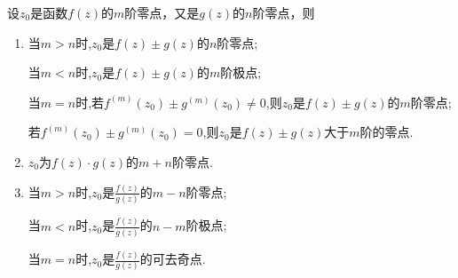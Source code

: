 \documentclass[../../main.tex]{subfiles}%
\begin{document}
\begin{proposition}\label{proposition:函数和积商的零点}
设$z_0$是函数$f(z)$的$m$阶零点，又是$g(z)$的$n$阶零点，则
\begin{enumerate}[(1)]
\item 当$m>n$时,$z_0$是$f(z)\pm  g(z)$的$n$阶零点;

当$m<n$时,$z_0$是$f(z)\pm  g(z)$的$m$阶极点;

当$m=n$时,若$f^{\left( m \right)}\left( z_0 \right) \pm g^{\left( m \right)}\left( z_0 \right) \neq0$,则$z_0$是$f(z)\pm  g(z)$的$m$阶零点;

若$f^{\left( m \right)}\left( z_0 \right) \pm g^{\left( m \right)}\left( z_0 \right)  = 0$,则$z_0$是$f(z)\pm g(z)$大于$m$阶的零点.

\item $z_0$为$f(z)\cdot g(z)$的$m+n$阶零点.

\item 当$m>n$时,$z_0$是$\frac{f(z)}{g(z)}$的$m-n$阶零点;

当$m<n$时,$z_0$是$\frac{f(z)}{g(z)}$的$n-m$阶极点;

当$m=n$时,$z_0$是$\frac{f(z)}{g(z)}$的可去奇点.
\end{enumerate}
\end{proposition}
\end{document}
